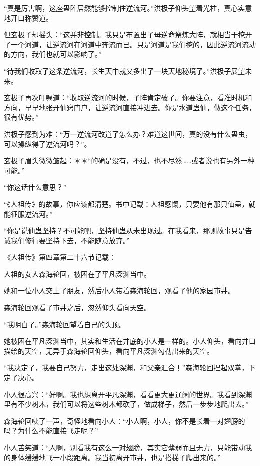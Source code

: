 
\begin{this_body}

“真是厉害啊，这座蛊阵居然能够控制住逆流河。”洪极子仰头望着光柱，真心实意地开口称赞道。

但玄极子却摇头：“这并非控制。我只是布置出子母逆命祭炼大阵，就相当于挖开了一个河道，让逆流河在河道中奔流而已。只是河道是我们挖的，因此逆流河流动的方向，我们也就可以影响了。”

“待我们收取了这条逆流河，长生天中就又多出了一块天地秘境了。”洪极子展望未来。

玄极子再次叮嘱道：“收取逆流河的时候，子阵肯定破了。你要注意，看准时机和方向，早早地张开仙窍门户，让逆流河直接冲进去。你是水道蛊仙，做这个任务，很有优势。”

洪极子感到为难：“万一逆流河改道了怎么办？难道这世间，真的没有什么蛊虫，可以操纵得了逆流河吗？”。

玄极子眉头微微皱起：＊＊“的确是没有，不过，也不尽然……或者说也有另外一种可能。”

“你这话什么意思？”

“《人祖传》的故事，你应该都清楚。书中记载：人祖感慨，只要他有那只仙蛊，就能征服逆流河。”

“你是说仙蛊坚持？不可能吧，坚持仙蛊从未出现过。在我看来，那则故事只是告诫我们修行要坚持下去，不能随意放弃。”

《人祖传》第四章第二十六节记载：

人祖的女人森海轮回，被困在了平凡深渊当中。

她和一位小人交上了朋友，然后小人带着森海轮回，观看了他的家园市井。

森海轮回观看了市井之后，忽然仰头看向天空。

“我明白了。”森海轮回望着自己的头顶。

她被困在平凡深渊当中，其实和生活在井底的小人是一样的。小人仰头，看向井口描绘的天空，无异于森海轮回仰头，看向平凡深渊勾勒出来的天空。

“我决定了，我要自己努力，走出这处深渊，和父亲汇合！”森海轮回捏起双拳，下定了决心。

小人很高兴：“好啊。我也想离开平凡深渊，看看更大更辽阔的世界。我看到深渊里有不少树木，我们可以将这些树木都砍了，做成梯子，然后一步步地爬出去。”

森海轮回咦了一声，奇怪地看向小人：“小人啊，小人，你不是长着一对翅膀的吗？为什么不能直接飞走呢？”

小人苦笑道：“人啊，别看我有这么一对翅膀，其实它薄弱而且无力，只能带动我的身体缓缓地飞一小段距离。我当初离开市井，也是搭梯子爬出来的。”


\end{this_body}

